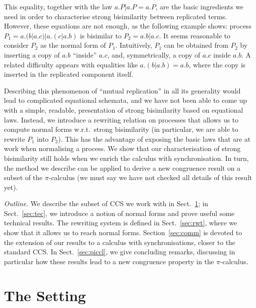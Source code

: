 \documentclass{llncs}
\begin{document}
This equality, together with the law $\!a.P|\!a.P = \!a.P$, are the
basic ingredients we need in order to characterise strong bisimilarity
between replicated terms. However, these equations are not enough, as
the following example shows: process $P_1 = \!a.(b|a.c)|\!a.(c|a.b)$
is bisimilar to $P_2 = \!a.b|\!a.c$. It seems reasonable to consider
$P_2$ as the normal form of $P_1$. Intuitively, $P_1$ can be obtained
from $P_2$ by inserting a copy of $a.b$ ``inside'' $\!a.c$, and,
symmetrically, a copy of $a.c$ inside $\!a.b$.  A related difficulty
appears with equalities like $\!a.(b|a.b) = \!a.b$, where the copy is
inserted in the replicated component itself.

Describing this phenomenon of ``mutual replication'' in all its
generality would lead to complicated equational schemata, and we have
not been able to come up with a simple, readable, presentation of
strong bisimilarity based on equational laws. Instead, we introduce a
rewriting relation on processes that allows us to compute normal forms
w.r.t.\ strong bisimilarity (in particular, we are able to rewrite
$P_1$ into $P_2$). This has the advantage of exposing the basic laws
that are at work when normalising a process. We show that our
characterisation of strong bisimilarity still holds when we enrich the
calculus with synchronisation. In turn, the method we describe can be
applied to derive a new congruence result on a subset of the
$\pi$-calculus (we must say we have not checked all details of this
result yet).


\medskip\noindent\textsl{Outline.}  We describe the subset of CCS we
work with in Sect.~\ref{sec:set}; in Sect.~\ref{sec:tec}, we introduce
a notion of normal forms and prove useful some technical results. The
rewriting system is defined in Sect.~\ref{sec:rwt}, where we show that
it allows us to reach normal forms. Section~\ref{sec:comm} is devoted
to the extension of our results to a calculus with synchronisations,
closer to the standard CCS. In Sect.~\ref{sec:piccl}, we give
concluding remarks, discussing in particular how these results lead to
a new congruence property in the $\pi$-calculus.


\section{The Setting}
\label{sec:set}
\end{document}
